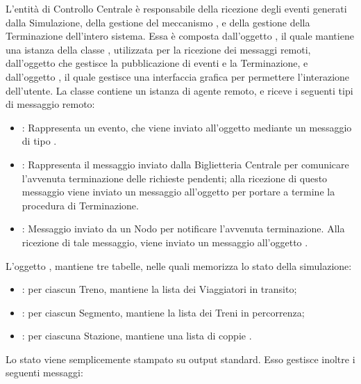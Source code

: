 	L'entità di Controllo Centrale è responsabile della ricezione degli eventi generati dalla Simulazione, della gestione del meccanismo , e della gestione della Terminazione dell'intero sistema.
	Essa è composta dall'oggetto , il quale mantiene una istanza della classe , utilizzata per la ricezione dei messaggi remoti, dall'oggetto   che gestisce la pubblicazione di eventi e la Terminazione, e dall'oggetto , il quale gestisce una interfaccia grafica per permettere l'interazione dell'utente.
	La classe  contiene un istanza di agente remoto, e riceve i seguenti tipi di messaggio remoto:
	\begin{itemize}
		\item {}: Rappresenta un evento, che viene inviato all'oggetto  mediante un messaggio di tipo .
		\item {}: Rappresenta il messaggio inviato dalla Biglietteria Centrale per comunicare l'avvenuta terminazione delle richieste pendenti; alla ricezione di questo messaggio viene inviato un messaggio  all'oggetto  per portare a termine la procedura di Terminazione.
		\item {}: Messaggio inviato da un Nodo per notificare l'avvenuta terminazione. Alla ricezione di tale messaggio, viene inviato un messaggio  all'oggetto .
	\end{itemize}
	L'oggetto , mantiene tre tabelle, nelle quali memorizza lo stato della simulazione:
		\begin{itemize}
			\item {}: per ciascun Treno, mantiene la lista dei Viaggiatori in transito;
			\item {}: per ciascun Segmento, mantiene la lista dei Treni in percorrenza;
			\item {}: per ciascuna Stazione, mantiene una lista di coppie .
		\end{itemize}
	Lo stato viene semplicemente stampato su output standard.
	Esso gestisce inoltre i seguenti messaggi:
	

